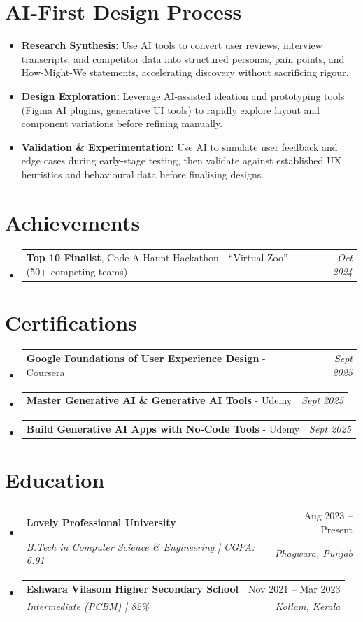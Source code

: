 \documentclass[11pt, letterpaper]{article}
\makeatletter
\newcommand{\resumeItem}[1]{%
  \item\small{#1\vspace{-1pt}}%
}
\newcommand{\resumeItemDated}[2]{%
  \item
  \vspace{-1pt}%
  \begin{tabularx}{\linewidth}[t]{@{}X r@{}}
    \small #1 & \small\textit{#2}
  \end{tabularx}%
  \vspace{-2pt}%
}
\newcommand{\resumeSubheading}[4]{%
  \vspace{4pt}\item[]%
  \begin{tabularx}{\linewidth}[t]{@{}X r@{}}
    \textbf{#1} & \small #2 \\[-1pt]
    \textit{\small #3} & \textit{\small #4} \\
  \end{tabularx}%
  \vspace{1pt}%
}
\newcommand{\resumeSubHeadingListStart}{%
  \begin{itemize}[leftmargin=0pt, label={}, itemsep=0pt, parsep=0pt, topsep=2pt]%
}
\newcommand{\resumeSubHeadingListEnd}{\end{itemize}\vspace{-4pt}}
\makeatother
\begin{document}
\section{AI-First Design Process}
\resumeSubHeadingListStart
  \resumeItem{\textbf{Research Synthesis:} Use AI tools to convert user reviews, interview transcripts, and competitor data into structured personas, pain points, and How-Might-We statements, accelerating discovery without sacrificing rigour.}
  \resumeItem{\textbf{Design Exploration:} Leverage AI-assisted ideation and prototyping tools (Figma AI plugins, generative UI tools) to rapidly explore layout and component variations before refining manually.}
  \resumeItem{\textbf{Validation \& Experimentation:} Use AI to simulate user feedback and edge cases during early-stage testing, then validate against established UX heuristics and behavioural data before finalising designs.}
\resumeSubHeadingListEnd
\section{Achievements}
\resumeSubHeadingListStart
  \resumeItemDated{\textbf{Top 10 Finalist}, Code-A-Haunt Hackathon - ``Virtual Zoo'' (50+ competing teams)}{Oct 2024}
\resumeSubHeadingListEnd
\section{Certifications}
\resumeSubHeadingListStart
  \resumeItemDated{\textbf{Google Foundations of User Experience Design} - Coursera}{Sept 2025}
  \resumeItemDated{\textbf{Master Generative AI \& Generative AI Tools} - Udemy}{Sept 2025}
  \resumeItemDated{\textbf{Build Generative AI Apps with No-Code Tools} - Udemy}{Sept 2025}
\resumeSubHeadingListEnd
\section{Education}
\resumeSubHeadingListStart
  \resumeSubheading
    {Lovely Professional University}{Aug 2023 -- Present}
    {B.Tech in Computer Science \& Engineering \textnormal{| CGPA: 6.91}}{Phagwara, Punjab}
  \resumeSubheading
    {Eshwara Vilasom Higher Secondary School}{Nov 2021 -- Mar 2023}
    {Intermediate (PCBM) \textnormal{| 82\%}}{Kollam, Kerala}
\resumeSubHeadingListEnd
\end{document}
